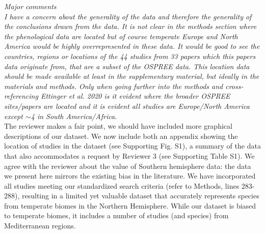 \documentclass[11pt]{article}
\begin{document}
\emph{Major comments}\\
\emph{I have a concern about the generality of the data and therefore the generality of the conclusions drawn from the data. It is not clear in the methods section where the phenological data are located but of course temperate Europe and North America would be highly overrepresented in these data. It would be good to see the countries, regions or locations of the 44 studies from 33 papers which this papers data originate from, that are a subset of the OSPREE data. This location data should be made available at least in the supplementary material, but ideally in the materials and methods. Only when going further into the methods and cross-referencing Ettinger et al. 2020 is it evident where the broader OSPREE sites/papers are located and it is evident all studies are Europe/North America except $\sim$4 in South America/Africa.}\\


The reviewer makes a fair point, we should have included more graphical descriptions of our dataset. We now include both an appendix showing the location of studies in the dataset (see Supporting Fig. S1), a summary of the data that also accommodates a request by Reviewer 3 (see Supporting Table S1). We agree with the reviewer about the value of Southern hemisphere data: the data we present here mirrors the existing bias in the literature. We have incorporated all studies meeting our standardized search criteria (refer to Methods, lines 283-288), resulting in a limited yet valuable dataset that accurately represents species from temperate biomes in the Northern Hemisphere. While our dataset is biased to temperate biomes, it includes a number of studies (and species) from Mediterranean regions.\\
\end{document}
